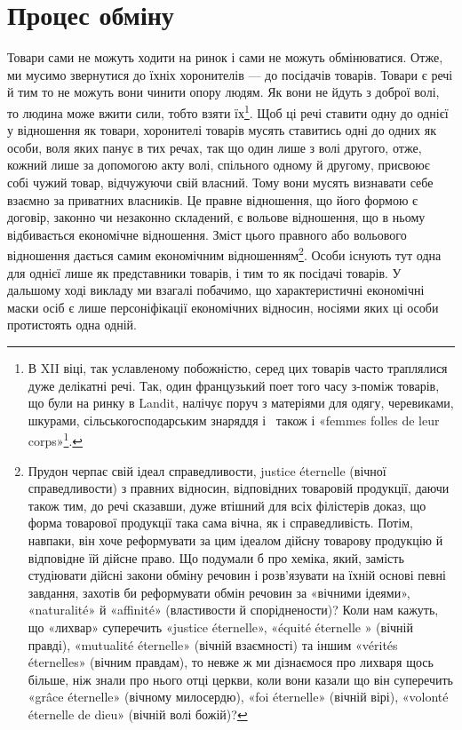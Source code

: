 \section{Процес обміну}

Товари сами не можуть ходити на ринок і сами не можуть
обмінюватися. Отже, ми мусимо звернутися до їхніх хоронителів —
до посідачів товарів. Товари є речі й тим то не можуть вони чинити
опору людям. Як вони не йдуть з доброї волі, то людина може
вжити сили, тобто взяти їх\footnote{
В XII віці, так уславленому побожністю, серед цих товарів часто
траплялися дуже делікатні речі. Так, один французький поет того часу
з-поміж товарів, що були на ринку в Landit, налічує поруч з матеріями
для одягу, черевиками, шкурами, сільськогосподарським знаряддя і~
також і «femmes folles de leur corps»\footnote*{
повій. \Red
}.}. Щоб ці речі ставити одну до однієї
у відношення як товари, хоронителі товарів мусять ставитись
одні до одних як особи, воля яких панує в тих речах, так що один
лише з волі другого, отже, кожний лише за допомогою акту волі,
спільного одному й другому, присвоює собі чужий товар, відчужуючи
свій власний. Тому вони мусять визнавати себе взаємно
за приватних власників. Це правне відношення, що його формою
є договір, законно чи незаконно складений, є вольове відношення,
що в ньому відбивається економічне відношення. Зміст цього
правного або вольового відношення дається самим економічним
відношенням\footnote{
Прудон черпає свій ідеал справедливости, justice éternelle (вічної
справедливости) з правних відносин, відповідних товаровій продукції,
даючи також тим, до речі сказавши, дуже втішний для всіх філістерів
доказ, що форма товарової продукції така сама вічна, як і справедливість.
Потім, навпаки, він хоче реформувати за цим ідеалом дійсну товарову
продукцію й відповідне їй дійсне право. Що подумали б про хеміка, який,
замість студіювати дійсні закони обміну речовин і розв’язувати на їхній
основі певні завдання, захотів би реформувати обмін речовин за «вічними
ідеями», «naturalité» й «affinité» (властивости й споріднености)? Коли
нам кажуть, що «лихвар» суперечить «justice éternelle», «équité éternelle
» (вічній правді), «mutualité éternelle» (вічній взаємності) та іншим
«vérités éternelles» (вічним правдам), то невже ж ми дізнаємося про лихваря
щось більше, ніж знали про нього отці церкви, коли вони казали
що він суперечить «grâce éternelle» (вічному милосердю), «foi éternelle»
(вічній вірі), «volonté éternelle de dieu» (вічній волі божій)?
}. Особи існують тут одна для однієї лише як представники
товарів, і тим то як посідачі товарів. У дальшому ході
викладу ми взагалі побачимо, що характеристичні економічні
маски осіб є лише персоніфікації економічних відносин, носіями
яких ці особи протистоять одна одній.


